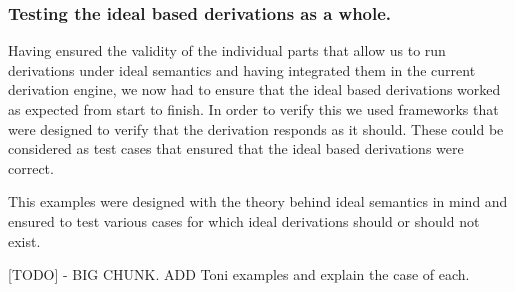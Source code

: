 \subsubsection{Testing the ideal based derivations as a whole.}
Having ensured the validity of the individual parts that allow us to run derivations under ideal semantics and having integrated them in the current derivation engine, we now had to ensure that the ideal based derivations worked as expected from start to finish. In order to verify this we used frameworks that were designed to verify that the derivation responds as it should. These could be considered as test cases that ensured that the ideal based derivations were correct.

This examples were designed with the theory behind ideal semantics in mind and ensured to test various cases for which ideal derivations should or should not exist.

[TODO] - BIG CHUNK. ADD Toni examples and explain the case of each.